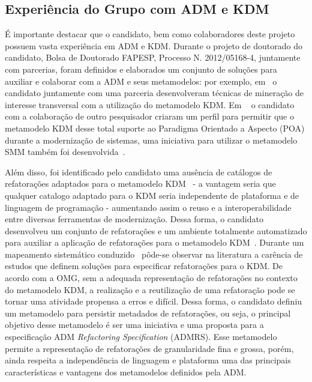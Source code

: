 \documentclass[12pt]{article}
\begin{document}
\subsection{Experiência do Grupo com ADM e KDM}

É importante destacar que o candidato, bem como colaboradores deste projeto possuem vasta experiência em ADM e KDM. Durante o projeto de doutorado do candidato, Bolsa de Doutorado FAPESP, Processo N. 2012/05168-4, juntamente com parcerias, foram definidos e elaborados um conjunto de soluções para auxiliar e colaborar com a ADM e seus metamodelos: por exemplo, em~\cite{dani_san_tool, dani_san, daniel_san_journal} o candidato juntamente com uma parceria desenvolveram técnicas de mineração de interesse transversal com a utilização do metamodelo KDM. Em ~\cite{Santos_2014, santo_wmod} o candidato com a colaboração de outro pesquisador criaram um perfil para permitir que o metamodelo KDM desse total suporte ao Paradigma Orientado a Aspecto (POA) durante a modernização de sistemas, uma iniciativa para utilizar o metamodelo SMM também foi desenvolvida~\cite{honda_dissertacao}. 

Além disso, foi identificado pelo candidato uma ausência de catálogos de refatorações adaptados para o metamodelo KDM~\cite{durelli_systematic_mapping} - a vantagem seria que qualquer catalogo adaptado para o KDM seria independente de plataforma e de linguagem de programação - aumentando assim o reuso e a interoperabilidade entre diversas ferramentas de modernização. Dessa forma, o candidato desenvolveu um conjunto de refatorações e um ambiente totalmente automatizado para auxiliar a aplicação de refatorações para o metamodelo KDM~\cite{durelli_catalogo, durelli_VEM_ferramenta}. Durante um mapeamento sistemático conduzido~\cite{durelli_systematic_mapping} pôde-se observar na literatura a carência de estudos que definem soluções para especificar refatorações para o KDM. De acordo com a OMG, sem a adequada representação de refatorações no contexto do metamodelo KDM, a realização e a reutilização de uma refatoração pode se tornar uma atividade propensa a erros e difícil. Dessa forma, o candidato definiu um metamodelo para persistir metadados de refatorações, ou seja, o principal objetivo desse metamodelo é ser uma iniciativa e uma proposta para a especificação ADM \textit{Refactoring Specification} (ADMRS). Esse metamodelo permite a representação de refatorações de granularidade fina e grossa, porém, ainda respeita a independência de linguagem e plataforma uma das principais características e vantagens dos metamodelos definidos pela ADM. 
\end{document}
